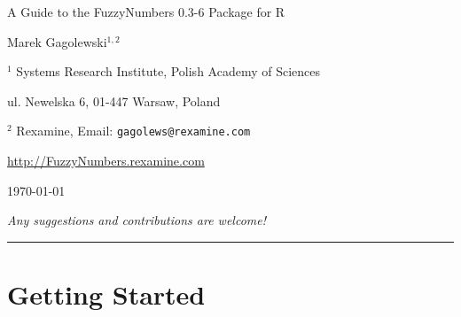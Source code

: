 \documentclass[11pt]{article}\usepackage[]{graphicx}\usepackage[]{color}
\newcommand{\package}[1]{\textsf{#1}\xspace}
\newcommand{\lang}[1]{\textsf{#1}\xspace}
\newcommand{\R}{\lang{R}}
\begin{document}
\begin{center}
{\LARGE\sf A Guide to the \package{FuzzyNumbers} {0.3-6} Package for \R}

\bigskip
{\large Marek Gagolewski${}^{1,2}$}

${}^{1}$ Systems Research Institute, Polish Academy of Sciences

ul. Newelska 6, 01-447 Warsaw, Poland

${}^{2}$ Rexamine, Email: \texttt{gagolews@rexamine.com}

\href{http://FuzzyNumbers.rexamine.com/}%
{http://FuzzyNumbers.rexamine.com}

\bigskip
\today



\medskip
\textit{Any suggestions and contributions are welcome!}
\end{center}





\bigskip\hrule\bigskip
\tableofcontents








\section{Getting Started}
\end{document}
